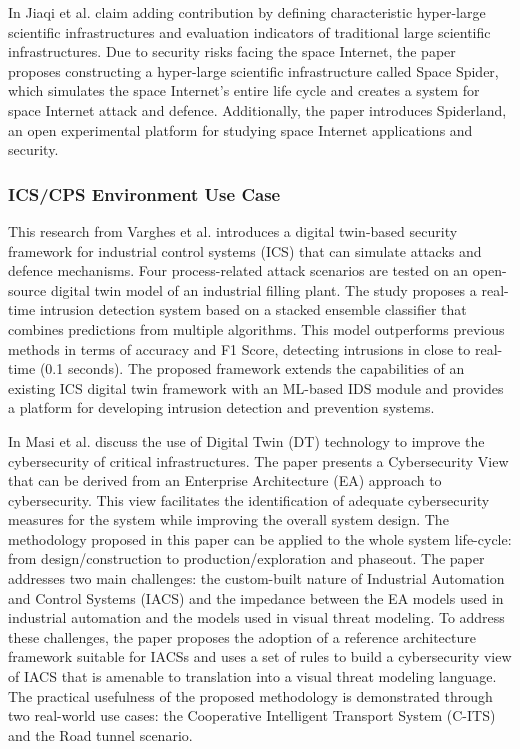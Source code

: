 In \cite{jiaqiliSpaceSpiderHyper2022} Jiaqi et al. claim adding contribution by defining characteristic hyper-large scientific infrastructures and evaluation indicators of traditional large scientific infrastructures. Due to security risks facing the space Internet, the paper proposes constructing a hyper-large scientific infrastructure called Space Spider, which simulates the space Internet's entire life cycle and creates a system for space Internet attack and defence. Additionally, the paper introduces Spiderland, an open experimental platform for studying space Internet applications and security.


\subsubsection{ICS/CPS Environment Use Case}

This\cite{vargheseDigitalTwinbasedIntrusion2022} research from Varghes et al. introduces a digital twin-based security framework for industrial control systems (ICS) that can simulate attacks and defence mechanisms. Four process-related attack scenarios are tested on an open-source digital twin model of an industrial filling plant. The study proposes a real-time intrusion detection system based on a stacked ensemble classifier that combines predictions from multiple algorithms. This model outperforms previous methods in terms of accuracy and F1 Score, detecting intrusions in close to real-time (0.1 seconds). The proposed framework extends the capabilities of an existing ICS digital twin framework with an ML-based IDS module and provides a platform for developing intrusion detection and prevention systems.


In\cite{masiSecuringCriticalInfrastructures2023} Masi et al. discuss the  use of Digital Twin (DT) technology to improve the cybersecurity of critical infrastructures. The paper presents a Cybersecurity View that can be derived from an Enterprise Architecture (EA) approach to cybersecurity. This view facilitates the identification of adequate cybersecurity measures for the system while improving the overall system design. The methodology proposed in this paper can be applied to the whole system life-cycle: from design/construction to production/exploration and phaseout. The paper addresses two main challenges: the custom-built nature of Industrial Automation and Control Systems (IACS) and the impedance between the EA models used in industrial automation and the models used in visual threat modeling. To address these challenges, the paper proposes the adoption of a reference architecture framework suitable for IACSs and uses a set of rules to build a cybersecurity view of IACS that is amenable to translation into a visual threat modeling language.  The practical usefulness of the proposed methodology is demonstrated through two real-world use cases: the Cooperative Intelligent Transport System (C-ITS) and the Road tunnel scenario. 

